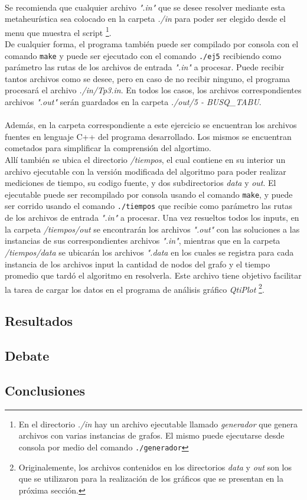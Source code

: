 \paragraph{}
Se recomienda que cualquier archivo \textit{".in"} que se desee resolver mediante esta metaheurística sea colocado en la carpeta \textit{./in} para poder ser elegido desde el menu que muestra el script \footnote{En el directorio \textit{./in} hay un archivo ejecutable llamado \textit{generador} que genera archivos con varias instancias de grafos. El mismo puede ejecutarse desde consola por medio del comando \texttt{./generador}}. \\
De cualquier forma, el programa también puede ser compilado por consola con el comando \texttt{make} y puede ser ejecutado con el comando \texttt{./ej5} recibiendo como parámetro las rutas de los archivos de entrada \textit{".in"} a procesar. Puede recibir tantos archivos como se desee, pero en caso de no recibir ninguno, el programa procesará el archivo \textit{./in/Tp3.in}. En todos los casos, los archivos correspondientes archivos \textit{".out"} serán guardados en la carpeta \textit{./out/5 - BUSQ\_TABU}.

\paragraph{}
Además, en la carpeta correspondiente a este ejercicio se encuentran los archivos fuentes en lenguaje C++ del programa desarrollado. Los mismos se encuentran cometados para simplificar la comprensión del algortimo. \\
Allí también se ubica el directorio \textit{/tiempos}, el cual contiene en su interior un archivo ejecutable con la versión modificada del algoritmo para poder realizar mediciones de tiempo, su codigo fuente, y dos subdirectorios \textit{data} y \textit{out}. El ejecutable puede ser recompilado por consola usando el comando \texttt{make}, y puede ser corrido usando el comando \texttt{./tiempos} que recibie como parámetro las rutas de los archivos de entrada \textit{".in"} a procesar. Una vez resueltos todos los inputs, en la carpeta \textit{/tiempos/out} se encontrarán los archivos \textit{".out"} con las soluciones a las instancias de sus correspondientes archivos \textit{".in"}, mientras que en la carpeta \textit{/tiempos/data} se ubicarán los archivos \textit{".data} en los cuales se registra para cada instancia de los archivos input la cantidad de nodos del grafo y el tiempo promedio que tardó el algoritmo en resolverla. Este archivo tiene objetivo facilitar la tarea de cargar los datos en el programa de análisis gráfico \textit{QtiPlot} \footnote{Originalemente, los archivos contenidos en los directorios \textit{data} y \textit{out} son los que se utilizaron para la realización de los gráficos que se presentan en la próxima sección.}.

\subsection{Resultados}
\subsection{Debate}
\subsection{Conclusiones}
